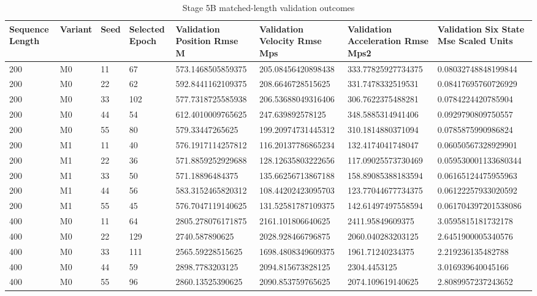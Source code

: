 \begin{table}[t]
\centering
\caption{Stage 5B matched-length validation outcomes}
\label{tab:stage5b}
\scriptsize
\begin{tabular}{llllllll}
\hline
Sequence Length & Variant & Seed & Selected Epoch & Validation Position Rmse M & Validation Velocity Rmse Mps & Validation Acceleration Rmse Mps2 & Validation Six State Mse Scaled Units \\
\hline
200 & M0 & 11 & 67 & 573.1468505859375 & 205.08456420898438 & 333.77825927734375 & 0.08032748848199844 \\
200 & M0 & 22 & 62 & 592.8441162109375 & 208.6646728515625 & 331.7478332519531 & 0.08417695760726929 \\
200 & M0 & 33 & 102 & 577.7318725585938 & 206.53688049316406 & 306.7622375488281 & 0.0784224420785904 \\
200 & M0 & 44 & 54 & 612.4010009765625 & 247.639892578125 & 348.5885314941406 & 0.0929790809750557 \\
200 & M0 & 55 & 80 & 579.33447265625 & 199.20974731445312 & 310.1814880371094 & 0.0785875990986824 \\
200 & M1 & 11 & 40 & 576.1917114257812 & 116.20137786865234 & 132.4174041748047 & 0.06050567328929901 \\
200 & M1 & 22 & 36 & 571.8859252929688 & 128.12635803222656 & 117.09025573730469 & 0.059530001133680344 \\
200 & M1 & 33 & 50 & 571.18896484375 & 135.66256713867188 & 158.89085388183594 & 0.06165124475955963 \\
200 & M1 & 44 & 56 & 583.3152465820312 & 108.44202423095703 & 123.77044677734375 & 0.06122257933020592 \\
200 & M1 & 55 & 45 & 576.7047119140625 & 131.52581787109375 & 142.61497497558594 & 0.061704397201538086 \\
400 & M0 & 11 & 64 & 2805.278076171875 & 2161.101806640625 & 2411.95849609375 & 3.0595815181732178 \\
400 & M0 & 22 & 129 & 2740.587890625 & 2028.928466796875 & 2060.040283203125 & 2.6451900005340576 \\
400 & M0 & 33 & 111 & 2565.59228515625 & 1698.4808349609375 & 1961.71240234375 & 2.219236135482788 \\
400 & M0 & 44 & 59 & 2898.7783203125 & 2094.815673828125 & 2304.4453125 & 3.016939640045166 \\
400 & M0 & 55 & 96 & 2860.13525390625 & 2090.853759765625 & 2074.109619140625 & 2.8089957237243652 \\

\end{tabular}
\end{table}
